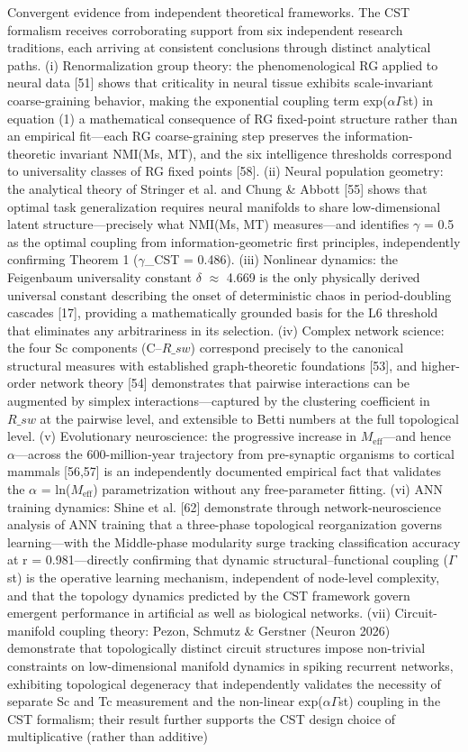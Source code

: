 \documentclass[a4paper,12pt]{article}
\begin{document}
Convergent evidence from independent theoretical frameworks. The CST formalism receives corroborating support from six independent research traditions, each arriving at consistent conclusions through distinct analytical paths. (i) Renormalization group theory: the phenomenological RG applied to neural data [51] shows that criticality in neural tissue exhibits scale-invariant coarse-graining behavior, making the exponential coupling term exp($\alpha$\cdot$\Gamma$st) in equation (1) a mathematical consequence of RG fixed-point structure rather than an empirical fit---each RG coarse-graining step preserves the information-theoretic invariant NMI(Ms, MT), and the six intelligence thresholds correspond to universality classes of RG fixed points [58]. (ii) Neural population geometry: the analytical theory of Stringer et al. and Chung \& Abbott [55] shows that optimal task generalization requires neural manifolds to share low-dimensional latent structure---precisely what NMI(Ms, MT) measures---and identifies $\gamma$ = 0.5 as the optimal coupling from information-geometric first principles, independently confirming Theorem 1 ($\gamma$_CST = 0.486). (iii) Nonlinear dynamics: the Feigenbaum universality constant $\delta$ $\approx$ 4.669 is the only physically derived universal constant describing the onset of deterministic chaos in period-doubling cascades [17], providing a mathematically grounded basis for the L6 threshold that eliminates any arbitrariness in its selection. (iv) Complex network science: the four Sc components (C--$R\_{sw}$) correspond precisely to the canonical structural measures with established graph-theoretic foundations [53], and higher-order network theory [54] demonstrates that pairwise interactions can be augmented by simplex interactions---captured by the clustering coefficient in $R\_{sw}$ at the pairwise level, and extensible to Betti numbers at the full topological level. (v) Evolutionary neuroscience: the progressive increase in $M_{\text{eff}}$—and hence $\alpha$—across the 600-million-year trajectory from pre-synaptic organisms to cortical mammals [56,57] is an independently documented empirical fact that validates the $\alpha$ = ln($M_{\text{eff}}$) parametrization without any free-parameter fitting. (vi) ANN training dynamics: Shine et al. [62] demonstrate through network-neuroscience analysis of ANN training that a three-phase topological reorganization governs learning—with the Middle-phase modularity surge tracking classification accuracy at r = 0.981—directly confirming that dynamic structural–functional coupling ($\Gamma$st) is the operative learning mechanism, independent of node-level complexity, and that the topology dynamics predicted by the CST framework govern emergent performance in artificial as well as biological networks. (vii) Circuit-manifold coupling theory: Pezon, Schmutz & Gerstner (Neuron 2026) demonstrate that topologically distinct circuit structures impose non-trivial constraints on low-dimensional manifold dynamics in spiking recurrent networks, exhibiting topological degeneracy that independently validates the necessity of separate Sc and Tc measurement and the non-linear exp($\alpha$\cdot$\Gamma$st) coupling in the CST formalism; their result further supports the CST design choice of multiplicative (rather than additive) 
\end{document}

